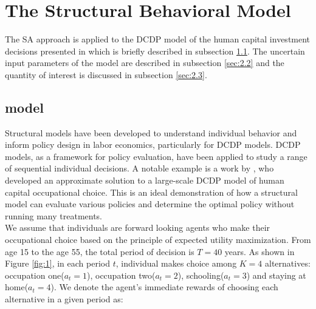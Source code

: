 \section{The Structural Behavioral Model} \label{sec:2}
\thispagestyle{plain} %


The SA approach is applied to the DCDP model of the human capital investment decisions presented in \cite{keane1994SolutionEstimationDiscrete} which is briefly described in subsection \ref{sec:2.1}. The uncertain input parameters of the model are described in subsection \ref{sec:2.2} and the quantity of interest is discussed in subsection \ref{sec:2.3}.

\subsection{\cite{keane1994SolutionEstimationDiscrete} model} \label{sec:2.1}

Structural models have been developed to understand individual behavior and inform policy design in labor economics, particularly for DCDP models. DCDP models, as a framework for policy evaluation, have been applied to study a range of sequential individual decisions. A notable example is a work by \cite{keane1994SolutionEstimationDiscrete}, who developed an approximate solution to a large-scale DCDP model of human capital occupational choice. This is an ideal demonstration of how a structural model can evaluate various policies and determine the optimal policy without running many treatments.\\

\noindent
We assume that individuals are forward looking agents who make their occupational choice based on the principle of expected utility maximization. From age 15 to the age 55, the total period of decision is $T=40$ years. As shown in Figure \ref{fig:1}, in each period $t$, individual makes choice among $K=4$ alternatives: occupation one($a_t=1$), occupation two($a_t=2$), schooling($a_t=3$) and staying at home($a_t=4$). We denote the agent's immediate rewards of choosing each alternative in a given period as:


